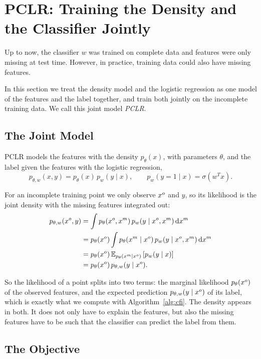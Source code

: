 \section{PCLR: Training the Density and the Classifier Jointly}
\label{sec:pclr}

Up to now, the classifier $w$ was trained on complete data and features were only
missing at test time. However, in practice, training data could also have missing features.

In this section we treat the density model and the logistic regression as one model of the features and the label together, and train both
jointly on the incomplete training data. We call this joint model \emph{PCLR}.

\subsection{The Joint Model}

PCLR models the features with the density $p_\theta(x)$, with parameters $\theta$, and the label given the features with the logistic regression,
\[
  p_{\theta, w}(x, y) = p_\theta(x)\, p_w(y \mid x), \qquad p_w(y = 1 \mid x) = \sigma(w^T x).
\]

For an incomplete training point we only observe $x^o$ and $y$, so its likelihood is the joint density with the missing features integrated out:
\begin{align*}
  p_{\theta, w}(x^o, y)
  &= \int p_\theta(x^o, x^m)\, p_w(y \mid x^o, x^m) \, \mathrm{d}x^m \\
  &= p_\theta(x^o) \int p_\theta(x^m \mid x^o)\, p_w(y \mid x^o, x^m) \, \mathrm{d}x^m \\
  &= p_\theta(x^o)\, \mathbb{E}_{p_\theta(x^m \mid x^o)} \left[ p_w(y \mid x) \right] \\
  &= p_\theta(x^o)\, p_{\theta, w}(y \mid x^o).
\end{align*}

So the likelihood of a point splits into two terms: the marginal likelihood $p_\theta(x^o)$ of the observed features, and
the expected prediction $p_{\theta, w}(y \mid x^o)$ of its label, which is exactly what we compute with Algorithm~\ref{alg:cfi}.
The density appears in both. It does not only have to explain the features, but also the missing features have to be such that the
classifier can predict the label from them.

\subsection{The Objective}

